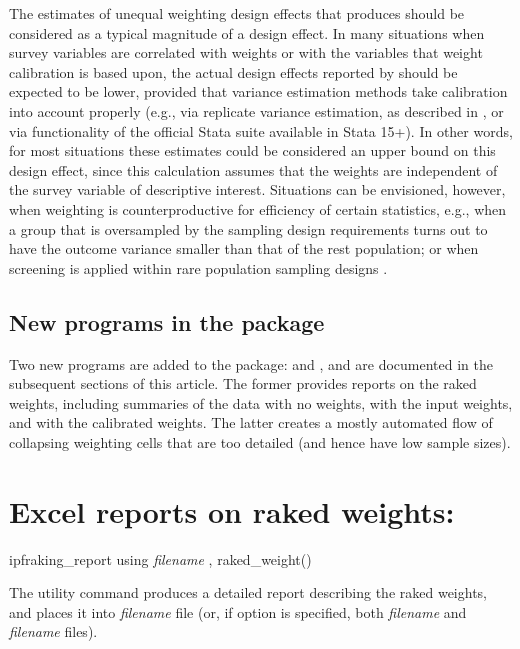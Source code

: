 The estimates of unequal weighting design effects that  produces
should be considered as a typical magnitude of a design effect.
In many situations when survey variables are correlated with weights
or with the variables that weight calibration is based upon, the actual
design effects reported by  should be expected
to be lower, provided that variance estimation methods take calibration
into account properly (e.g., via replicate variance estimation, as described
in \citet{kolenikov:2010}, or via  functionality
of the official Stata  suite available in Stata 15+).
In other words, for most situations these estimates could be considered an upper bound
on this design effect, since this calculation assumes that the weights are independent of
the survey variable of descriptive interest. Situations can be envisioned, however,
when weighting is counterproductive for efficiency of certain statistics,
e.g., when a group that is oversampled by the sampling design requirements
turns out to have the outcome variance smaller than that of the rest population;
or when screening is applied within rare population sampling designs
\citep{kalton:anderson:1986,kalton:2009}.


\subsection{New programs in the package}

Two new programs are added to the package:  and ,
and are documented in the subsequent sections of this article. The former provides reports on the raked weights,
including summaries of the data with no weights, with the input weights, and with the calibrated weights.
The latter creates a mostly automated flow of collapsing weighting cells that are too detailed
(and hence have low sample sizes).

\section{Excel reports on raked weights:  }

\begin{stsyntax}
ipfraking\_report
using \textit{filename}
,
raked\_weight(\varname)
\end{stsyntax}

The utility command  produces a detailed report
describing the raked weights, and places it into \textit{filename} file
(or, if  option is specified, both \textit{filename} and \textit{filename}
files).

